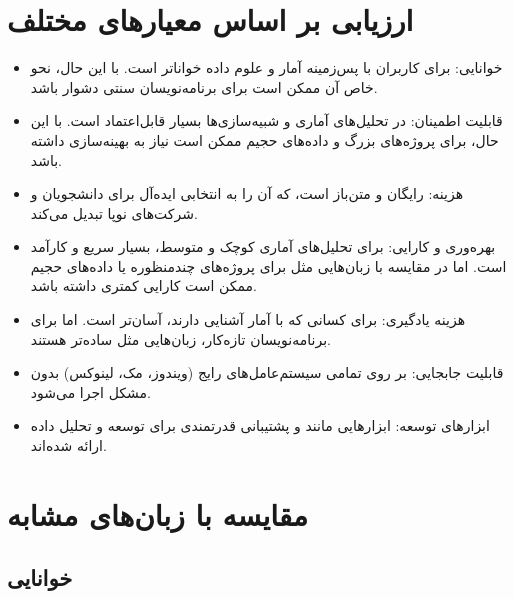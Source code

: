\documentclass[11pt, a4paper, oneside]{book}
\begin{document}
			
		\section{ارزیابی بر اساس معیارهای مختلف}
			
			\begin{itemize}
				
				\item {\large خوانایی}:
				{\normalsize برای کاربران با پس‌زمینه آمار و علوم داده خواناتر است. با این حال، نحو خاص آن ممکن است برای برنامه‌نویسان سنتی دشوار باشد.}
				
				\item {\large قابلیت اطمینان}:
				{\normalsize در تحلیل‌های آماری و شبیه‌سازی‌ها بسیار قابل‌اعتماد است. با این حال، برای پروژه‌های بزرگ و داده‌های حجیم ممکن است نیاز به بهینه‌سازی داشته باشد.}
				
				\item {\large هزینه}:
				{\normalsize رایگان و متن‌باز است، که آن را به انتخابی ایده‌آل برای دانشجویان و شرکت‌های نوپا تبدیل می‌کند.}
				
				\item {\large بهره‌وری و کارایی}:
				{\normalsize برای تحلیل‌های آماری کوچک و متوسط،  بسیار سریع و کارآمد است. اما در مقایسه با زبان‌هایی مثل  برای پروژه‌های چندمنظوره یا داده‌های حجیم ممکن است کارایی کمتری داشته باشد.}
				
				\item {\large هزینه یادگیری}:
				{\normalsize برای کسانی که با آمار آشنایی دارند، آسان‌تر است. اما برای برنامه‌نویسان تازه‌کار، زبان‌هایی مثل  ساده‌تر هستند.}
				
				\item {\large قابلیت جابجایی}:
				{\normalsize بر روی تمامی سیستم‌عامل‌های رایج (ویندوز، مک، لینوکس) بدون مشکل اجرا می‌شود.}
				
				\item {\large ابزارهای توسعه}:
				{\normalsize ابزارهایی مانند  و  پشتیبانی قدرتمندی برای توسعه و تحلیل داده ارائه شده‌اند‌.}
				
			\end{itemize}
			
		
		
		\section{مقایسه با زبان‌های مشابه}
		
									
			\subsection{خوانایی}
				
\end{document}
